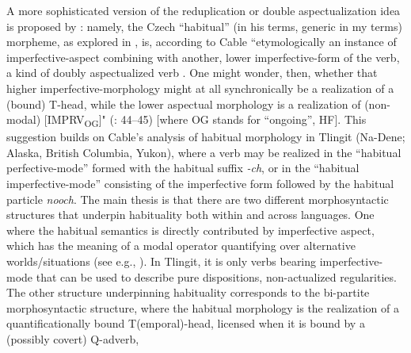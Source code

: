\documentclass[output=paper,colorlinks,citecolor=brown]{langscibook}
\begin{document}
A more sophisticated version of the reduplication or double aspectualization idea is
proposed by \citet{cable2022}: namely, the Czech ``habitual'' (in his terms, generic in my terms) morpheme, as explored in \citet{Filip2018incable}, is, according to Cable ``etymologically an instance of imperfective-aspect
combining with another, lower imperfective-form of the verb, a kind of doubly aspectualized verb \citep{Filip2018incable}.
One might wonder, then, whether that higher imperfective-morphology might
at all synchronically be a realization of a (bound) T-head, while the lower aspectual morphology is a realization of (non-modal) [IMPRV\textsubscript{OG}]" (\citealt{cable2022}: 44--45) [where OG stands for ``ongoing'', HF].
This suggestion builds on Cable's analysis of habitual morphology
in Tlingit (Na-Dene; Alaska, British Columbia, Yukon),
where a verb may be realized in the ``habitual perfective-mode'' formed with the habitual suffix \textit{-ch}, or in the ``habitual imperfective-mode'' consisting of the imperfective form followed by the habitual particle \textit{nooch}.
The main thesis is that there are two different morphosyntactic structures that underpin habituality both within and across languages. One where
the habitual semantics is directly contributed by imperfective aspect, which has the
meaning of a modal operator quantifying over alternative worlds/situations (see e.g., \citealt{ferreira2016}).
In Tlingit, it is only verbs bearing imperfective-mode that can be used to describe pure dispositions, non-actualized regularities.
The other structure underpinning habituality corresponds to the bi-partite morphosyntactic structure, where
the habitual morphology is the realization of
a quantificationally bound T(emporal)-head, licensed when it is bound by a (possibly covert) Q-adverb,
\end{document}

